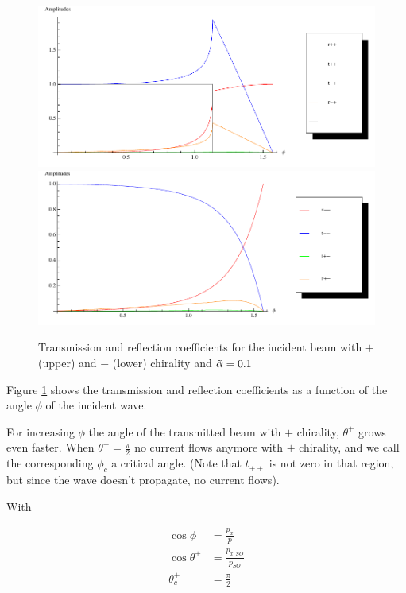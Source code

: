 \begin{figure}[h!tp]
    \includegraphics[width=\textwidth]{zero-plus.pdf}
    \includegraphics[width=\textwidth]{zero-minus.pdf}
    \caption{Transmission and reflection coefficients for the
            incident beam with $+$ (upper) and $-$ (lower) chirality
            and $\tilde \alpha = 0.1$}
    \label{fig:trans-zero}
\end{figure}

Figure \ref{fig:trans-zero} shows the transmission and reflection
coefficients as a function of the angle $\phi$ of the incident wave.

For increasing $\phi$ the angle of the transmitted beam with $+$
chirality, $\theta^+$ grows even faster. When $\theta^+ =
\frac{\pi}{2}$ no current flows anymore with $+$ chirality, and we
call the corresponding $\phi_c$ a critical angle. (Note that $t_{++}$
is not zero in that region, but since the wave doesn't propagate, no
current flows).

With

\begin{align}
    \cos \phi       &= \frac{p_x}{p}\\
    \cos \theta^+   &= \frac{p_{x,SO}}{p_{SO}}\\
    \theta_c^+      &= \frac{\pi}{2}
\end{align}

